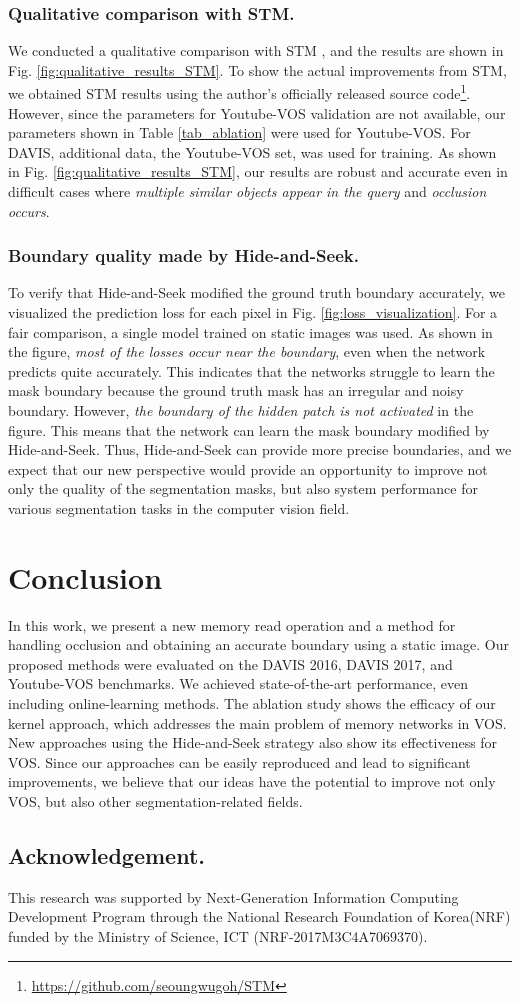 \subsubsection{Qualitative comparison with STM.}
We conducted a qualitative comparison with STM \cite{Oh_2019_ICCV}, and the results are shown in Fig. \ref{fig:qualitative_results_STM}. To show the actual improvements from STM, we obtained STM results using the author's officially released source code\footnote{\url{https://github.com/seoungwugoh/STM}}. However, since the parameters for Youtube-VOS validation are not available, our parameters shown in Table \ref{tab_ablation} were used for Youtube-VOS. For DAVIS, additional data, the Youtube-VOS set, was used for training. As shown in Fig. \ref{fig:qualitative_results_STM}, our results are robust and accurate even in difficult cases where \textit{multiple similar objects appear in the query} and \textit{occlusion occurs}.

\subsubsection{Boundary quality made by Hide-and-Seek.}
To verify that Hide-and-Seek modified the ground truth boundary accurately, we visualized the prediction loss for each pixel in Fig. \ref{fig:loss_visualization}. For a fair comparison, a single model trained on static images was used. As shown in the figure, \textit{most of the losses occur near the boundary}, even when the network predicts quite accurately. This indicates that the networks struggle to learn the mask boundary because the ground truth mask has an irregular and noisy boundary. However, \textit{the boundary of the hidden patch is not activated} in the figure. This means that the network can learn the mask boundary modified by Hide-and-Seek. Thus, Hide-and-Seek can provide more precise boundaries, and we expect that our new perspective would provide an opportunity to improve not only the quality of the segmentation masks, but also system performance for various segmentation tasks in the computer vision field.

\section{Conclusion}
\label{s5}
In this work, we present a new memory read operation and a method for handling occlusion and obtaining an accurate boundary using a static image. Our proposed methods were evaluated on the DAVIS 2016, DAVIS 2017, and Youtube-VOS benchmarks. We achieved state-of-the-art performance, even including online-learning methods. The ablation study shows the efficacy of our kernel approach, which addresses the main problem of memory networks in VOS. New approaches using the Hide-and-Seek strategy also show its effectiveness for VOS. Since our approaches can be easily reproduced and lead to significant improvements, we believe that our ideas have the potential to improve not only VOS, but also other segmentation-related fields.

\subsection*{Acknowledgement.}
This research was supported by Next-Generation Information Computing Development Program through the National Research Foundation of Korea(NRF) funded by the Ministry of Science, ICT (NRF-2017M3C4A7069370).

\clearpage

